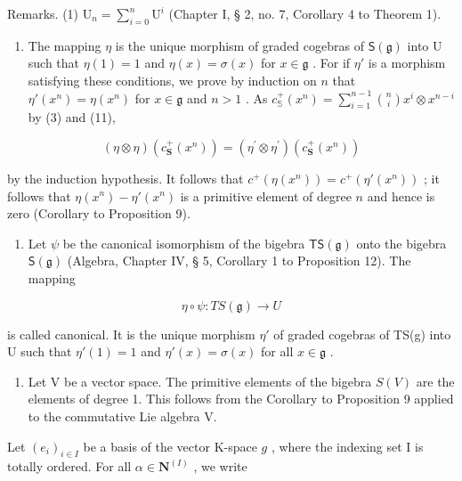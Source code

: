 Remarks. (1) \(\mathrm{U}_n = \sum_{i=0}^{n} \mathrm{U}^i\) (Chapter I, § 2, no. 7, Corollary 4 to Theorem 1).

\begin{enumerate}
\def\labelenumi{(\arabic{enumi})}
\setcounter{enumi}{1}
\tightlist
\item
  The mapping \(\eta\) is the unique morphism of graded cogebras of \(\mathsf{S}(\mathfrak{g})\) into U such that \(\eta(1) = 1\) and \(\eta(x) = \sigma(x)\) for \(x \in \mathfrak{g}\) . For if \(\eta'\) is a morphism satisfying these conditions, we prove by induction on \(n\) that \(\eta'(x^n) = \eta(x^n)\) for \(x \in \mathfrak{g}\) and \(n > 1\) . As \(c_{\mathbb{S}}^{+}(x^{n}) = \sum_{i=1}^{n-1} \binom{n}{i} x^{i} \otimes x^{n-i}\) by (3) and (11),
\end{enumerate}

\[
(\eta \otimes \eta) (c _ {\mathbf {S}} ^ {+} (x ^ {n})) = (\eta^ {\prime} \otimes \eta^ {\prime}) (c _ {\mathbf {S}} ^ {+} (x ^ {n}))
\]

by the induction hypothesis. It follows that \(c^{+}(\eta(x^{n})) = c^{+}(\eta'(x^{n}))\) ; it follows that \(\eta(x^{n}) - \eta'(x^{n})\) is a primitive element of degree \(n\) and hence is zero (Corollary to Proposition 9).

\begin{enumerate}
\def\labelenumi{(\arabic{enumi})}
\setcounter{enumi}{2}
\tightlist
\item
  Let \(\psi\) be the canonical isomorphism of the bigebra \(\mathsf{TS}(\mathfrak{g})\) onto the bigebra \(\mathsf{S}(\mathfrak{g})\) (Algebra, Chapter IV, § 5, Corollary 1 to Proposition 12). The mapping
\end{enumerate}

\[
\eta \circ \psi : T S (\mathfrak {g}) \rightarrow U
\]

is called canonical. It is the unique morphism \(\eta'\) of graded cogebras of TS(g) into U such that \(\eta'(1) = 1\) and \(\eta'(x) = \sigma(x)\) for all \(x \in \mathfrak{g}\) .

\begin{enumerate}
\def\labelenumi{(\arabic{enumi})}
\setcounter{enumi}{3}
\tightlist
\item
  Let V be a vector space. The primitive elements of the bigebra \(S(V)\) are the elements of degree 1. This follows from the Corollary to Proposition 9 applied to the commutative Lie algebra V.
\end{enumerate}

Let \((e_i)_{i\in I}\) be a basis of the vector K-space \(g\) , where the indexing set I is totally ordered. For all \(\alpha \in \mathbf{N}^{(I)}\) , we write

